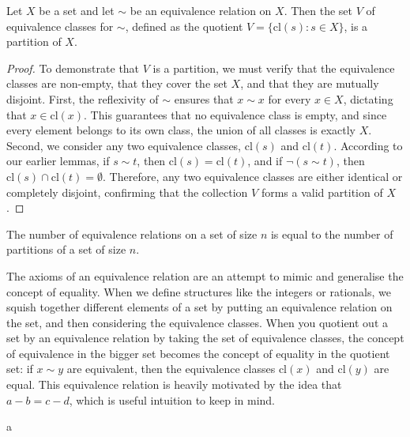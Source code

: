 \documentclass[../ium.tex]{subfiles}
\begin{document}
\begin{theorem}
\begin{shaded*}
Let $X$ be a set and let $\sim$ be an equivalence relation on $X$. Then the set $V$ of equivalence classes for $\sim$, defined as the quotient $V = \{\mathrm{cl}(s) : s \in X\}$, is a partition of $X$.
\end{shaded*}
\end{theorem}
\begin{proof}
To demonstrate that $V$ is a partition, we must verify that the equivalence classes are non-empty, that they cover the set $X$, and that they are mutually disjoint. First, the reflexivity of $\sim$ ensures that $x \sim x$ for every $x \in X$, dictating that $x \in \mathrm{cl}(x)$. This guarantees that no equivalence class is empty, and since every element belongs to its own class, the union of all classes is exactly $X$. Second, we consider any two equivalence classes, $\mathrm{cl}(s)$ and $\mathrm{cl}(t)$. According to our earlier lemmas, if $s \sim t$, then $\mathrm{cl}(s) = \mathrm{cl}(t)$, and if $\neg(s \sim t)$, then $\mathrm{cl}(s) \cap \mathrm{cl}(t) = \emptyset$. Therefore, any two equivalence classes are either identical or completely disjoint, confirming that the collection $V$ forms a valid partition of $X$.
\end{proof}

\begin{remark}
The number of equivalence relations on a set of size $n$ is equal to the number of partitions of a set of size $n$.
\end{remark}

\begin{remark}
The axioms of an equivalence relation are an attempt to mimic and generalise the concept of equality. When we define structures like the integers or rationals, we squish together different elements of a set by putting an equivalence relation on the set, and then considering the equivalence classes. When you quotient out a set by an equivalence relation by taking the set of equivalence classes, the concept of equivalence in the bigger set becomes the concept of equality in the quotient set: if $x \sim y$ are equivalent, then the equivalence classes $\mathrm{cl}(x)$ and $\mathrm{cl}(y)$ are equal. This equivalence relation is heavily motivated by the idea that $a-b = c-d$, which is useful intuition to keep in mind.
\end{remark}

\newpage

a
\end{document}
